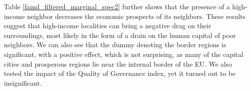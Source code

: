 \documentclass[11pt]{article}
\begin{document}
Table \ref{famd_filtered_marginal_spec2} further shows that the presence of a high-income neighbor decreases the economic prospects of its neighbors. These results suggest that high-income localities can bring a negative drag on their surroundings, most likely in the form of a drain on the human capital of poor neighbors. We can also see that the dummy denoting the border regions is significant, with a positive effect, which is not surprising, as many of the capital cities and prosperous regions lie near the internal border of the EU. We also tested the impact of the Quality of Governance index, yet it turned out to be insignificant.

\begin{table}[!htbp] \centering
{}
\end{table}
\end{document}
